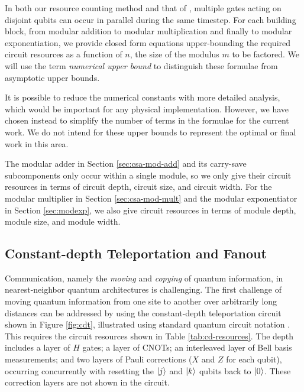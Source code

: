 In both our resource counting method and that of \cite{Fowler2004,Kutin2006}, multiple gates acting on disjoint qubits
can occur in parallel during the same timestep. For each building block,
from modular addition to modular multiplication and finally to modular
exponentiation, we provide closed form equations upper-bounding the required circuit
resources as a function of $n$, the size of the modulus $m$ to be factored.
We will use the
term \emph{numerical upper bound} to distinguish these formulae from asymptotic
upper bounds.

It is possible to reduce the numerical constants with more detailed analysis,
which would be important for any physical implementation.
However, we have chosen instead to simplify the number of terms in the formulae
for the current work. We do not intend for these upper bounds to represent
the optimal or final work in this area.

The modular adder in Section \ref{sec:csa-mod-add} and its carry-save
subcomponents only occur within a single module, so we only give their
circuit resources in terms of circuit depth, circuit size, and circuit width. 
For the modular multiplier in
Section \ref{sec:csa-mod-mult} and the modular exponentiator in
Section \ref{sec:modexp}, we also give circuit resources in
terms of module depth, module size, and module width.

\subsection{Constant-depth Teleportation and Fanout}
\label{subsec:fanout}

Communication, namely the \emph{moving} and \emph{copying} of quantum information, in nearest-neighbor quantum architectures is challenging.
The first challenge of moving quantum information from one site to another over
arbitrarily long distances can be addressed by using
the constant-depth teleportation circuit
shown in Figure \ref{fig:cdt}, illustrated using standard quantum circuit
notation \cite{Nielsen2000}. This requires the circuit resources shown in
Table \ref{tab:cd-resources}. The depth includes a layer of $H$ gates; a layer of CNOTs; an interleaved layer of Bell basis measurements; and two layers of
Pauli corrections ($X$ and $Z$ for each qubit), occurring concurrently with
resetting the $\left\vert{j}\right\rangle$ and $\left\vert{k}\right\rangle$ qubits back to $\left\vert{0}\right\rangle$.
These correction layers are not shown in the circuit.

